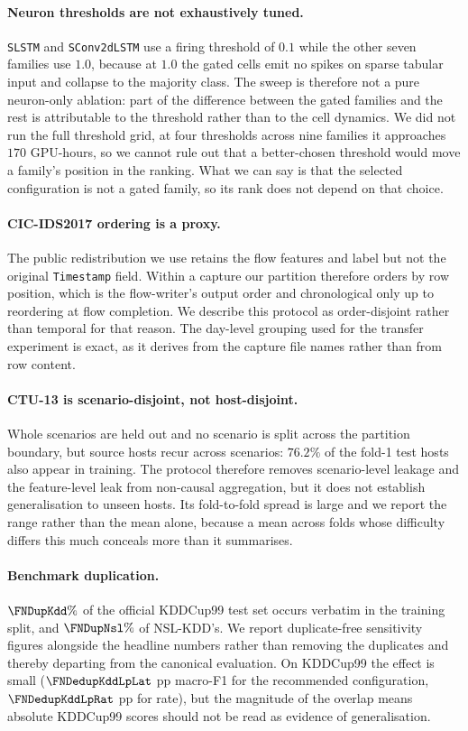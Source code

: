 \paragraph{Neuron thresholds are not exhaustively tuned.}
\texttt{SLSTM} and \texttt{SConv2dLSTM} use a firing threshold of $0.1$ while the
other seven families use $1.0$, because at $1.0$ the gated cells emit no spikes
on sparse tabular input and collapse to the majority class. The sweep is
therefore not a pure neuron-only ablation: part of the difference between the
gated families and the rest is attributable to the threshold rather than to the
cell dynamics. We did not run the full threshold grid, at four thresholds
across nine families it approaches $170$ GPU-hours, so we cannot rule out
that a better-chosen threshold would move a family's position in the ranking.
What we can say is that the selected configuration is not a gated family, so its
rank does not depend on that choice.

\paragraph{CIC-IDS2017 ordering is a proxy.}
The public redistribution we use retains the flow features and label but not the
original \texttt{Timestamp} field. Within a capture our partition therefore
orders by row position, which is the flow-writer's output order and
chronological only up to reordering at flow completion. We describe this
protocol as order-disjoint rather than temporal for that reason. The day-level
grouping used for the transfer experiment is exact, as it derives from the
capture file names rather than from row content.

\paragraph{CTU-13 is scenario-disjoint, not host-disjoint.}
Whole scenarios are held out and no scenario is split across the partition
boundary, but source hosts recur across scenarios: $76.2\%$ of the fold-1 test
hosts also appear in training. The protocol therefore removes scenario-level
leakage and the feature-level leak from non-causal aggregation, but it does not
establish generalisation to unseen hosts. Its fold-to-fold spread is large and
we report the range rather than the mean alone, because a mean across folds
whose difficulty differs this much conceals more than it summarises.

\paragraph{Benchmark duplication.}
$\FNDupKdd\%$ of the official KDDCup99 test set occurs verbatim in the training
split, and $\FNDupNsl\%$ of NSL-KDD's. We report duplicate-free sensitivity figures
alongside the headline numbers rather than removing the duplicates and thereby
departing from the canonical evaluation. On KDDCup99 the effect is small
($\FNDedupKddLpLat$ pp macro-F1 for the recommended configuration,
$\FNDedupKddLpRat$ pp for rate), but the magnitude of the overlap means absolute
KDDCup99 scores should not be read as evidence of generalisation.

